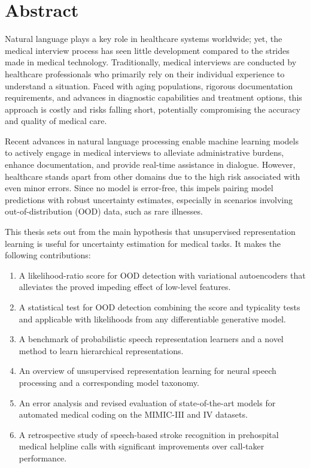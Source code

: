 
\chapter[abstract]{Abstract}

Natural language plays a key role in healthcare systems worldwide; yet, the medical interview process has seen little development compared to the strides made in medical technology. 
Traditionally, medical interviews are conducted by healthcare professionals who primarily rely on their individual experience to understand a situation. 
Faced with aging populations, rigorous documentation requirements, and advances in diagnostic capabilities and treatment options, this approach is costly and risks falling short, potentially compromising the accuracy and quality of medical care.

Recent advances in natural language processing enable machine learning models to actively engage in medical interviews to alleviate administrative burdens, enhance documentation, and provide real-time assistance in dialogue. 
However, healthcare stands apart from other domains due to the high risk associated with even minor errors. Since no model is error-free, this impels pairing model predictions with robust uncertainty estimates, especially in scenarios involving out-of-distribution (OOD) data, such as rare illnesses. 

This thesis sets out from the main hypothesis that unsupervised representation learning is useful for uncertainty estimation for medical tasks. 
It makes the following contributions:
%
\begin{enumerate}[topsep=3pt, partopsep=0pt, itemsep=3pt, parsep=0pt, leftmargin=2em, label=(\alph*)] %
    \item A likelihood-ratio score for OOD detection with variational autoencoders that alleviates the proved impeding effect of low-level features.
    \item A statistical test for OOD detection combining the score and typicality tests and applicable with likelihoods from any differentiable generative model.
    \item A benchmark of probabilistic speech representation learners and a novel method to learn hierarchical representations.
    \item An overview of unsupervised representation learning for neural speech processing and a corresponding model taxonomy.
    \item An error analysis and revised evaluation of state-of-the-art models for automated medical coding on the MIMIC-III and IV datasets. 
    \item A retrospective study of speech-based stroke recognition in prehospital medical helpline calls with significant improvements over call-taker performance.
\end{enumerate}
%

